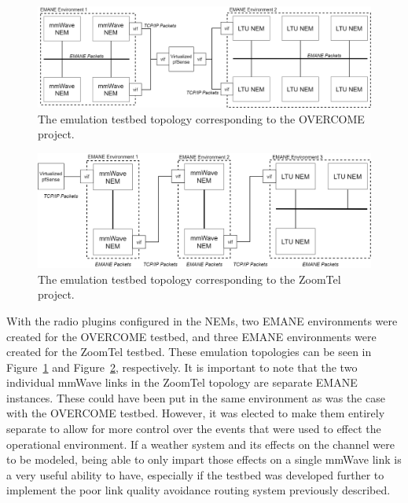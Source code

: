 \begin{figure}[!ht]
    \centering
    \includegraphics[width=\textwidth,keepaspectratio]{Images/Chpt3/EMANE_OVERCOME.png}
    \caption{The emulation testbed topology corresponding to the OVERCOME project.}
    \label{overcome_emane}
\end{figure}
\begin{figure}[!ht]
    \centering
    \includegraphics[width=\textwidth,keepaspectratio]{Images/Chpt3/EMANE_ZoomTel.png}
    \caption{The emulation testbed topology corresponding to the ZoomTel project.}
    \label{ZoomTel_emane}
\end{figure}
With the radio plugins configured in the NEMs, two EMANE environments were created for the OVERCOME testbed, and three EMANE environments were created for the ZoomTel testbed.
These emulation topologies can be seen in Figure~\ref{overcome_emane} and Figure~\ref{ZoomTel_emane}, respectively.
It is important to note that the two individual mmWave links in the ZoomTel topology are separate EMANE instances.
These could have been put in the same environment as was the case with the OVERCOME testbed.
However, it was elected to make them entirely separate to allow for more control over the events that were used to effect the operational environment.
If a weather system and its effects on the channel were to be modeled, being able to only impart those effects on a single mmWave link is a very useful ability to have, especially if the testbed was developed further to implement the poor link quality avoidance routing system previously described.\par
